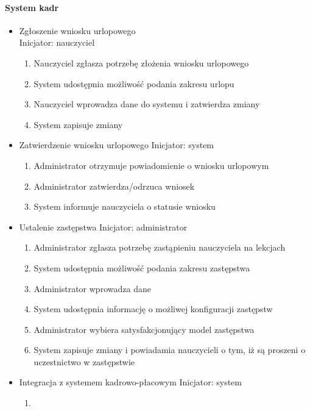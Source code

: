 \documentclass{article}
\begin{document}
\paragraph{System kadr}
\begin{itemize}


\item Zgłoszenie wniosku urlopowego\\
Inicjator: nauczyciel
\begin{enumerate}
\item Nauczyciel zgłasza potrzebę złożenia wniosku urlopowego
\item System udostępnia możliwość podania zakresu urlopu
\item Nauczyciel wprowadza dane do systemu i zatwierdza zmiany
\item System zapisuje zmiany
\end{enumerate}
\item Zatwierdzenie wniosku urlopowego
Inicjator: system
\begin{enumerate}
\item Administrator otrzymuje powiadomienie o wniosku urlopowym
\item Administrator zatwierdza/odrzuca wniosek
\item System informuje nauczyciela o statusie wniosku
\end{enumerate}
\item Ustalenie zastępstwa
Inicjator: administrator
\begin{enumerate}
\item Administrator zgłasza potrzebę zastąpieniu nauczyciela na lekcjach
\item System udostępnia możliwość podania zakresu zastępstwa
\item Administrator wprowadza dane
\item System udostępnia informację o możliwej konfiguracji zastępstw
\item Administrator wybiera satysfakcjonujący model zastępstwa
\item System zapisuje zmiany i powiadamia nauczycieli o tym, iż są proszeni o uczestnictwo w zastępstwie
\end{enumerate}
\item Integracja z systemem kadrowo-płacowym
Inicjator: system
\begin{enumerate}
\item 
\end{enumerate}


\end{itemize}
\end{document}
